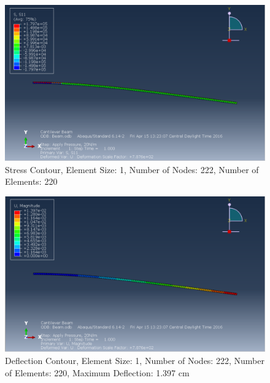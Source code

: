 \documentclass[a4paper]{article}
\begin{document}
\begin{figure}[ht]
\centering
\includegraphics[scale=.50]{3Nsize1Stress.PNG}
\caption{Stress Contour, Element Size: 1, Number of Nodes: 222, Number of Elements: 220}
\end{figure}
\begin{figure}[ht]
\centering
\includegraphics[scale=.50]{3Nsize1MDisplacement.PNG}
\caption{Deflection Contour, Element Size: 1, Number of Nodes: 222, Number of Elements: 220, Maximum Deflection: 1.397 cm}
\end{figure}
\end{document}
